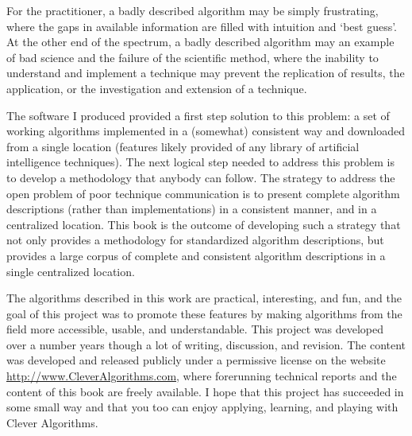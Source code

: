 For the practitioner, a badly described algorithm may be simply frustrating, where the gaps in available information are filled with intuition and `best guess'. At the other end of the spectrum, a badly described algorithm may an example of bad science and the failure of the scientific method, where the inability to understand and implement a technique may prevent the replication of results, the application, or the investigation and extension of a technique. 

The software I produced provided a first step solution to this problem: a set of working algorithms implemented in a (somewhat) consistent way and downloaded from a single location (features likely provided of any library of artificial intelligence techniques). The next logical step needed to address this problem is to develop a methodology that anybody can follow. The strategy to address the open problem of poor technique communication is to present complete algorithm descriptions (rather than implementations) in a consistent manner, and in a centralized location.
This book is the outcome of developing such a strategy that not only provides a methodology for standardized algorithm descriptions, but provides a large corpus of complete and consistent algorithm descriptions in a single centralized location. 

The algorithms described in this work are practical, interesting, and fun, and the goal of this project was to promote these features by making algorithms from the field more accessible, usable, and understandable.
This project was developed over a number years though a lot of writing, discussion, and revision. The content was developed and released publicly under a permissive license on the website \url{http://www.CleverAlgorithms.com}, where forerunning technical reports and the content of this book are freely available.
I hope that this project has succeeded in some small way and that you too can enjoy applying, learning, and playing with Clever Algorithms. 



% 
% 
